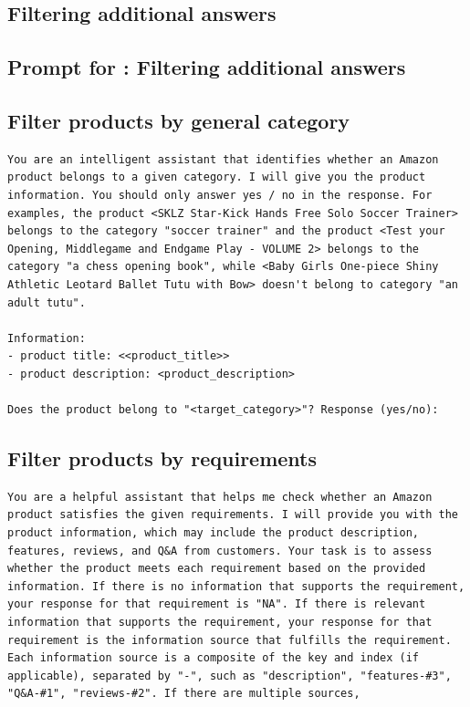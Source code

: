 \subsection{Filtering additional answers}
\begin{mdframed}[backgroundcolor=cyan!5, linecolor=black, linewidth=2pt, innerleftmargin=10pt, innerrightmargin=10pt, innertopmargin=3pt, innerbottommargin=10pt]
\section*{Prompt for \amazont: Filtering additional answers}
\subsection*{Filter products by general category}
\begin{lstlisting}
You are an intelligent assistant that identifies whether an Amazon product belongs to a given category. I will give you the product information. You should only answer yes / no in the response. For examples, the product <SKLZ Star-Kick Hands Free Solo Soccer Trainer> belongs to the category "soccer trainer" and the product <Test your Opening, Middlegame and Endgame Play - VOLUME 2> belongs to the category "a chess opening book", while <Baby Girls One-piece Shiny Athletic Leotard Ballet Tutu with Bow> doesn't belong to category "an adult tutu".

Information:
- product title: <<product_title>>
- product description: <product_description>

Does the product belong to "<target_category>"? Response (yes/no): 
\end{lstlisting}

\subsection*{Filter products by requirements}
\begin{lstlisting}
You are a helpful assistant that helps me check whether an Amazon product satisfies the given requirements. I will provide you with the product information, which may include the product description, features, reviews, and Q&A from customers. Your task is to assess whether the product meets each requirement based on the provided information. If there is no information that supports the requirement, your response for that requirement is "NA". If there is relevant information that supports the requirement, your response for that requirement is the information source that fulfills the requirement. Each information source is a composite of the key and index (if applicable), separated by "-", such as "description", "features-#3", "Q&A-#1", "reviews-#2". If there are multiple sources, 


\end{lstlisting}
\end{mdframed}

